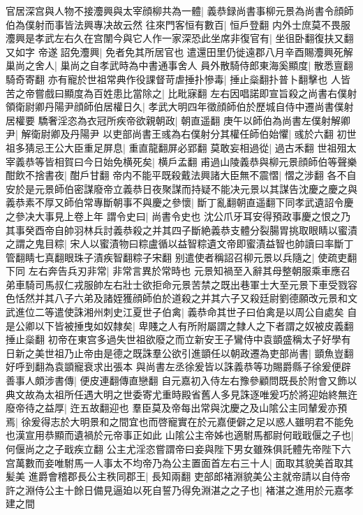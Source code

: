 官居深宫與人物不接灋興與太宰顔柳共為一體|{
	義恭録尚書事柳元景為尚書令顔師伯為僕射而事皆法興專决故云然}
往來門客恒有數百|{
	恒戶登翻}
内外士庶莫不畏服灋興是孝武左右久在宫闈今與它人作一家深恐此坐席非復官有|{
	坐徂卧翻復扶又翻又如字}
帝遂詔免灋興|{
	免者免其所居官也}
遣還田里仍徙遠郡八月辛酉賜灋興死解巢尚之舍人|{
	巢尚之自孝武時為中書通事舍人}
員外散騎侍郎東海奚顯度|{
	散悉亶翻騎奇寄翻}
亦有寵於世祖常典作役課督苛虐捶扑慘毒|{
	捶止橤翻扑普卜翻擊也}
人皆苦之帝嘗戲曰顯度為百姓患比當除之|{
	比毗寐翻}
左右因唱諾即宣旨殺之尚書右僕射領衛尉卿丹陽尹顔師伯居權日久|{
	孝武大明四年徵顔師伯於歷城自侍中遷尚書僕射居權要}
驕奢淫恣為衣冠所疾帝欲親朝政|{
	朝直遥翻}
庚午以師伯為尚書左僕射解卿尹|{
	解衛尉卿及丹陽尹}
以吏部尚書王彧為右僕射分其權任師伯始懼|{
	彧於六翻}
初世祖多猜忌王公大臣重足屏息|{
	重直龍翻屏必郢翻}
莫敢妄相過從|{
	過古禾翻}
世祖殂太宰義恭等皆相賀曰今日始免横死矣|{
	横戶孟翻}
甫過山陵義恭與柳元景顔師伯等聲樂酣飲不捨書夜|{
	酣戶甘翻}
帝内不能平既殺戴法興諸大臣無不震慴|{
	慴之涉翻}
各不自安於是元景師伯密謀廢帝立義恭日夜聚謀而持疑不能决元景以其謀告沈慶之慶之與義恭素不厚又師伯常專斷朝事不與慶之參懷|{
	斷丁亂翻朝直遥翻下同孝武遺詔令慶之參决大事見上卷上年}
謂令史曰|{
	尚書令史也}
沈公爪牙耳安得預政事慶之恨之乃其事癸酉帝自帥羽林兵討義恭殺之并其四子斷絶義恭支體分裂腸胃挑取眼睛以蜜漬之謂之鬼目粽|{
	宋人以蜜漬物曰粽盧循以益智粽遺文帝即蜜漬益智也帥讀曰率斷丁管翻睛七真翻眼珠子漬疾智翻粽子宋翻}
别遣使者稱詔召柳元景以兵隨之|{
	使疏吏翻下同}
左右奔告兵刃非常|{
	非常言異於常時也}
元景知禍至入辭其母整朝服乘車應召弟車騎司馬叔仁戎服帥左右壯士欲拒命元景苦禁之既出巷軍士大至元景下車受戮容色恬然并其八子六弟及諸姪獲顔師伯於道殺之并其六子又殺廷尉劉德願改元景和文武進位二等遣使誅湘州刺史江夏世子伯禽|{
	義恭命其世子曰伯禽是以周公自處矣}
自是公卿以下皆被捶曳如奴隸矣|{
	卑賤之人有所附屬謂之隸人之下者謂之奴被皮義翻捶止橤翻}
初帝在東宫多過失世祖欲廢之而立新安王子鸞侍中袁顗盛稱太子好學有日新之美世祖乃止帝由是德之既誅羣公欲引進顗任以朝政遷為吏部尚書|{
	顗魚豈翻好呼到翻為袁顗寵衰求出張本}
與尚書左丞徐爰皆以誅義恭等功賜爵縣子徐爰便辟善事人頗涉書傳|{
	便皮連翻傳直戀翻}
自元嘉初入侍左右豫參顧問既長於附會又飾以典文故為太祖所任遇大明之世委寄尤重時殿省舊人多見誅逐唯爰巧於將迎始終無迕廢帝待之益厚|{
	迕五故翻迎也}
羣臣莫及帝每出常與沈慶之及山隂公主同輦爰亦預焉|{
	徐爰得志於大明景和之間宜也而啓寵實在於元嘉便僻之足以惑人雖明君不能免也漢宣用恭顯而遺禍於元帝事正如此}
山隂公主帝姊也適駙馬都尉何戢戢偃之子也|{
	何偃尚之之子戢疾立翻}
公主尤淫恣嘗謂帝曰妾與陛下男女雖殊俱託體先帝陛下六宫萬數而妾唯駙馬一人事太不均帝乃為公主置面首左右三十人|{
	面取其貌美首取其髪美}
進爵會稽郡長公主秩同郡王|{
	長知兩翻}
吏部郎褚淵貌美公主就帝請以自侍帝許之淵侍公主十餘日備見逼廹以死自誓乃得免淵湛之之子也|{
	褚湛之進用於元嘉孝建之間}
